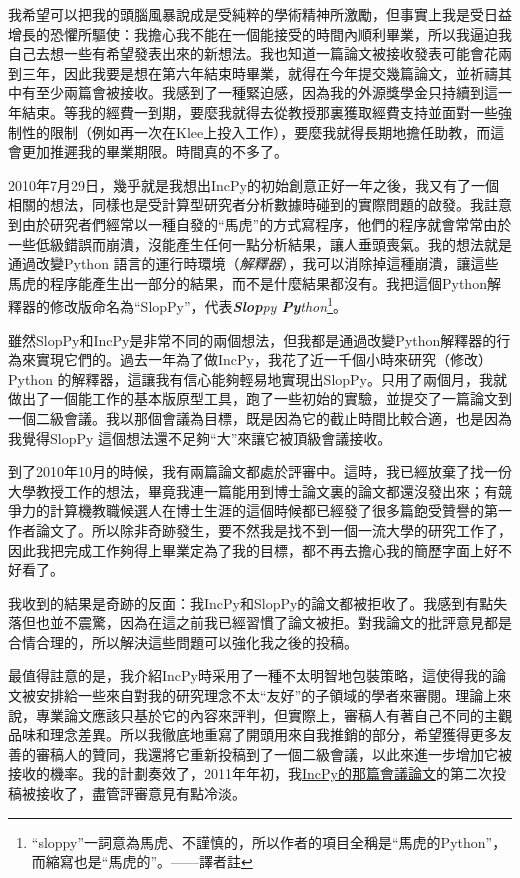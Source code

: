 \documentclass[12pt,UTF8,nofonts]{book}
\begin{document}
我希望可以把我的頭腦風暴說成是受純粹的學術精神所激勵，但事實上我是受日益增長的恐懼所驅使：我擔心我不能在一個能接受的時間內順利畢業，所以我逼迫我自己去想一些有希望發表出來的新想法。我也知道一篇論文被接收發表可能會花兩到三年，因此我要是想在第六年結束時畢業，就得在今年提交幾篇論文，並祈禱其中有至少兩篇會被接收。我感到了一種緊迫感，因為我的外源獎學金只持續到這一年結束。等我的經費一到期，要麼我就得去從教授那裏獲取經費支持並面對一些強制性的限制（例如再一次在Klee上投入工作），要麼我就得長期地擔任助教，而這會更加推遲我的畢業期限。時間真的不多了。

2010年7月29日，幾乎就是我想出IncPy的初始創意正好一年之後，我又有了一個相關的想法，同樣也是受計算型研究者分析數據時碰到的實際問題的啟發。我註意到由於研究者們經常以一種自發的“馬虎”的方式寫程序，他們的程序就會常常由於一些低級錯誤而崩潰，沒能產生任何一點分析結果，讓人垂頭喪氣。我的想法就是通過改變Python 語言的運行時環境（\emph{解釋器}），我可以消除掉這種崩潰，讓這些馬虎的程序能產生出一部分的結果，而不是什麼結果都沒有。我把這個Python解釋器的修改版命名為“SlopPy”，代表\emph{\textbf{Slop}py \textbf{Py}thon}\footnote{``sloppy''一詞意為馬虎、不謹慎的，所以作者的項目全稱是“馬虎的Python”，而縮寫也是“馬虎的”。——譯者註}。

雖然SlopPy和IncPy是非常不同的兩個想法，但我都是通過改變Python解釋器的行為來實現它們的。過去一年為了做IncPy，我花了近一千個小時來研究（修改）Python 的解釋器，這讓我有信心能夠輕易地實現出SlopPy。只用了兩個月，我就做出了一個能工作的基本版原型工具，跑了一些初始的實驗，並提交了一篇論文到一個二級會議。我以那個會議為目標，既是因為它的截止時間比較合適，也是因為我覺得SlopPy 這個想法還不足夠“大”來讓它被頂級會議接收。

\breakline

到了2010年10月的時候，我有兩篇論文都處於評審中。這時，我已經放棄了找一份大學教授工作的想法，畢竟我連一篇能用到博士論文裏的論文都還沒發出來；有競爭力的計算機教職候選人在博士生涯的這個時候都已經發了很多篇飽受贊譽的第一作者論文了。所以除非奇跡發生，要不然我是找不到一個一流大學的研究工作了，因此我把完成工作夠得上畢業定為了我的目標，都不再去擔心我的簡歷字面上好不好看了。

我收到的結果是奇跡的反面：我IncPy和SlopPy的論文都被拒收了。我感到有點失落但也並不震驚，因為在這之前我已經習慣了論文被拒。對我論文的批評意見都是合情合理的，所以解決這些問題可以強化我之後的投稿。

最值得註意的是，我介紹IncPy時采用了一種不太明智地包裝策略，這使得我的論文被安排給一些來自對我的研究理念不太“友好”的子領域的學者來審閱。理論上來說，專業論文應該只基於它的內容來評判，但實際上，審稿人有著自己不同的主觀品味和理念差異。所以我徹底地重寫了開頭用來自我推銷的部分，希望獲得更多友善的審稿人的贊同，我還將它重新投稿到了一個二級會議，以此來進一步增加它被接收的機率。我的計劃奏效了，2011年年初，我\href{http://www.pgbovine.net/projects/pubs/guo_issta11_camera_ready.pdf}{IncPy的那篇會議論文}的第二次投稿被接收了，盡管評審意見有點冷淡。
\end{document}
